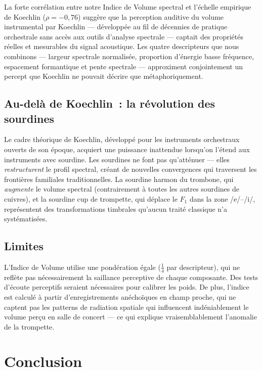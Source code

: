 \documentclass[journal]{IEEEtran}
\begin{document}
La forte corrélation entre notre Indice de Volume spectral et l'échelle empirique de Koechlin ($\rho = -0{,}76$) suggère que la perception auditive du \og volume \fg{} instrumental par Koechlin --- développée au fil de décennies de pratique orchestrale sans accès aux outils d'analyse spectrale --- captait des propriétés réelles et mesurables du signal acoustique. Les quatre descripteurs que nous combinons --- largeur spectrale normalisée, proportion d'énergie basse fréquence, espacement formantique et pente spectrale --- approximent conjointement un percept que Koechlin ne pouvait décrire que métaphoriquement.

\subsection{Au-delà de Koechlin~: la révolution des sourdines}

Le cadre théorique de Koechlin, développé pour les instruments orchestraux ouverts de son époque, acquiert une puissance inattendue lorsqu'on l'étend aux instruments avec sourdine. Les sourdines ne font pas qu'atténuer --- elles \emph{restructurent} le profil spectral, créant de nouvelles convergences qui traversent les frontières familiales traditionnelles. La sourdine harmon du trombone, qui \textit{augmente} le volume spectral (contrairement à toutes les autres sourdines de cuivres), et la sourdine cup de trompette, qui déplace le $F_1$ dans la zone /e/--/i/, représentent des transformations timbrales qu'aucun traité classique n'a systématisées.

\subsection{Limites}

L'Indice de Volume utilise une pondération égale ($\frac{1}{4}$ par descripteur), qui ne reflète pas nécessairement la saillance perceptive de chaque composante. Des tests d'écoute perceptifs seraient nécessaires pour calibrer les poids. De plus, l'indice est calculé à partir d'enregistrements anéchoïques en champ proche, qui ne captent pas les patterns de radiation spatiale qui influencent indéniablement le volume perçu en salle de concert --- ce qui explique vraisemblablement l'anomalie de la trompette.

\section{Conclusion}
\label{sec:conclusion}
\end{document}
